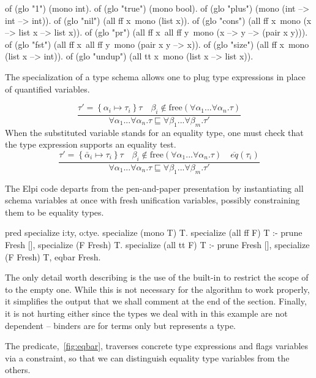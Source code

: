 \documentclass{these-ISSS}
\newenvironment{elpicode}
  {\VerbatimEnvironment\begin{elpibox}\begin{xelpicode}}{\end{xelpicode}
\end{elpibox}}
\begin{document}
\begin{elpicode}
of (glo "1")      (mono int).
of (glo "true")   (mono bool).
of (glo "plus")   (mono (int --> int --> int)).
of (glo "nil")    (all ff x\ mono (list x)).
of (glo "cons")   (all ff x\ mono (x --> list x --> list x)).
of (glo "pr")     (all ff x\ all ff y\ mono (x --> y --> (pair x y))).
of (glo "fst")    (all ff x\ all ff y\ mono (pair x y --> x)).
of (glo "size")   (all ff x\ mono (list x --> int)).
of (glo "undup")  (all tt x\ mono (list x --> list x)).
\end{elpicode}
\noindent
The specialization of a type schema allows one to plug type expressions in
place of quantified variables.

$$
\displaystyle\frac{\tau' = \left\{\alpha_i \mapsto \tau_i\right\} \tau \quad \beta_i \not\in \textrm{free}(\forall \alpha_1...\forall\alpha_n . \tau)}{\forall \alpha_1...\forall\alpha_n . \tau \sqsubseteq \forall \beta_1...\forall\beta_m . \tau'}
$$
 When the substituted variable stands for an
equality type, one must check that the type expression supports an equality
test.
$$
\displaystyle\frac{\tau' = \left\{\bar\alpha_i \mapsto \tau_i\right\} \tau \quad \beta_i \not\in \textrm{free}(\forall \alpha_1...\forall\alpha_n . \tau) \quad \overline{eq}(\tau_i)}{\forall \alpha_1...\forall\alpha_n . \tau \sqsubseteq \forall \beta_1...\forall\beta_m . \tau'}
$$

The Elpi code departs from the pen-and-paper presentation by instantiating all
schema variables at once with fresh unification variables, possibly
constraining them to be equality types.

\begin{elpicode}
pred specialize i:ty, o:tye.
specialize (mono T) T.
specialize (all ff F) T :-
  prune Fresh [], specialize (F Fresh) T.
specialize (all tt F) T :-
  prune Fresh [], specialize (F Fresh) T, eqbar Fresh.
\end{elpicode}
\noindent
The only detail worth describing is the use of the  built-in
to restrict the scope of  to the empty one. While this is not
necessary for the algorithm to work properly, it simplifies the output
that we shall comment at the end of the section. Finally, it is not hurting either
since the types we deal with in this example are not dependent -- binders
are for terms only but  represents a type.

The  predicate,~\cref{fig:eqbar}, traverses concrete type expressions and
flags variables via a constraint, so that we can distinguish
equality type variables from the others.
\end{document}
